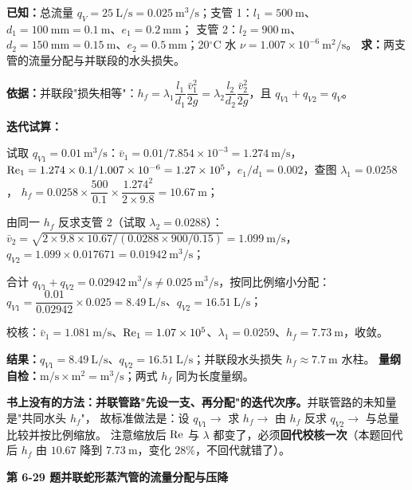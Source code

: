 \begin{jie}
\textbf{已知：}总流量 $q_V=25\ \mathrm{L/s}=0.025\ \mathrm{m^3/s}$；支管 1：$l_1=500\ \mathrm{m}$、$d_1=100\ \mathrm{mm}=0.1\ \mathrm{m}$、$e_1=0.2\ \mathrm{mm}$；
支管 2：$l_2=900\ \mathrm{m}$、$d_2=150\ \mathrm{mm}=0.15\ \mathrm{m}$、$e_2=0.5\ \mathrm{mm}$；20$^\circ$C 水 $\nu=1.007\times10^{-6}\ \mathrm{m^2/s}$。
\textbf{求：}两支管的流量分配与并联段的水头损失。

\textbf{依据：}并联段"损失相等"：$h_f=\lambda_1\dfrac{l_1}{d_1}\dfrac{\bar v_1^2}{2g}
=\lambda_2\dfrac{l_2}{d_2}\dfrac{\bar v_2^2}{2g}$，且 $q_{V1}+q_{V2}=q_V$。

\textbf{迭代试算：}
\begin{xiaowen}
\item 试取 $q_{V1}=0.01\ \mathrm{m^3/s}$：$\bar v_1=0.01/7.854\times10^{-3}=1.274\ \mathrm{m/s}$，
$\mathrm{Re}_1=1.274\times0.1/1.007\times10^{-6}=1.27\times10^5$，$e_1/d_1=0.002$，查图 $\lambda_1=0.0258$，
$h_f=0.0258\times\dfrac{500}{0.1}\times\dfrac{1.274^2}{2\times9.8}=10.67\ \mathrm{m}$；
\item 由同一 $h_f$ 反求支管 2（试取 $\lambda_2=0.0288$）：
$\bar v_2=\sqrt{2\times9.8\times10.67/(0.0288\times900/0.15)}=1.099\ \mathrm{m/s}$，
$q_{V2}=1.099\times0.017671=0.01942\ \mathrm{m^3/s}$；
\item 合计 $q_{V1}+q_{V2}=0.02942\ \mathrm{m^3/s}\ne0.025\ \mathrm{m^3/s}$，按同比例缩小分配：
$q_{V1}=\dfrac{0.01}{0.02942}\times0.025=8.49\ \mathrm{L/s}$、$q_{V2}=16.51\ \mathrm{L/s}$；
\item 校核：$\bar v_1=1.081\ \mathrm{m/s}$、$\mathrm{Re}_1=1.07\times10^5$、$\lambda_1=0.0259$、$h_f=7.73\ \mathrm{m}$，收敛。
\end{xiaowen}

\textbf{结果：}$q_{V1}=8.49\ \mathrm{L/s}$、$q_{V2}=16.51\ \mathrm{L/s}$；并联段水头损失 $h_f\approx7.7\ \mathrm{m}$ 水柱。
\textbf{量纲自检：}$\mathrm{m/s\times m^2}=\mathrm{m^3/s}$；两式 $h_f$ 同为长度量纲。
\end{jie}

\begin{tishi}
\textbf{书上没有的方法：并联管路"先设一支、再分配"的迭代次序。}并联管路的未知量是"共同水头 $h_f$"，
故标准做法是：设 $q_{V1}\to$ 求 $h_f\to$ 由 $h_f$ 反求 $q_{V2}\to$ 与总量比较并按比例缩放。
注意缩放后 $\mathrm{Re}$ 与 $\lambda$ 都变了，必须\textbf{回代校核一次}（本题回代后 $h_f$ 由 $10.67$ 降到 $7.73\ \mathrm{m}$，变化 $28\%$，不回代就错了）。
\end{tishi}

\noindent\textbf{第 6-29 题\quad 并联蛇形蒸汽管的流量分配与压降}

